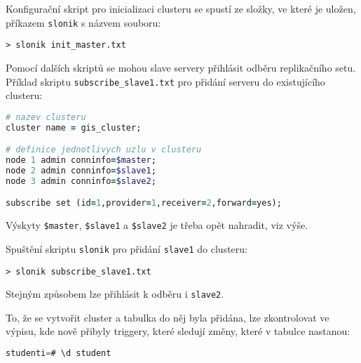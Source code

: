Konfigurační skript pro i\-ni\-ci\-a\-li\-za\-ci clusteru se spustí ze složky, ve které je
uložen, příkazem \texttt{slonik} s názvem souboru:

\begin{lstlisting}
> slonik init_master.txt
\end{lstlisting}

Pomocí dalších skriptů se mohou slave servery přihlásit odběru replikačního
setu. Příklad skriptu \texttt{subscribe\_slave1.txt} pro přidání serveru do
existujícího clusteru:
\begin{lstlisting}[language=ruby]
# nazev clusteru
cluster name = gis_cluster;

# definice jednotlivych uzlu v clusteru
node 1 admin conninfo=$master;
node 2 admin conninfo=$slave1;
node 3 admin conninfo=$slave2;

subscribe set (id=1,provider=1,receiver=2,forward=yes);
\end{lstlisting}
Výskyty \texttt{\$master}, \texttt{\$slave1} a \texttt{\$slave2} je třeba opět
nahradit, viz výše.

Spuštění skriptu \texttt{slonik} pro přidání \texttt{slave1} do clusteru:
\begin{lstlisting}
> slonik subscribe_slave1.txt
\end{lstlisting}
Stejným způsobem lze přihlásit k odběru i \texttt{slave2}.

To, že se vytvořit cluster a tabulka do něj byla přidána, lze zkontrolovat ve
výpisu, kde nově přibyly triggery, které sledují změny, které v tabulce
nastanou:

\begin{lstlisting}[language=sql]
studenti=# \d student
\end{lstlisting}

